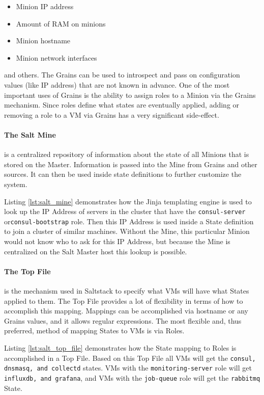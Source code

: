 \begin{itemize}
\item Minion IP address
\item Amount of RAM on minions
\item Minion hostname
\item Minion network interfaces
\end{itemize}

and others. The Grains can be used to introspect and pass on configuration values (like IP address) that are not known in advance. One of the most important uses of Grains is the ability to assign roles to a Minion via the Grains mechanism. Since roles define what states are eventually applied, adding or removing a role to a VM via Grains has a very significant side-effect. 

\paragraph{The Salt Mine} is a centralized repository of information about the state of all Minions that is stored on the Master. Information is passed into the Mine from Grains and other sources. It can then be used inside state definitions to further customize the system.  

Listing \ref{lst:salt_mine} demonstrates how the Jinja templating engine is used to look up the IP Address of servers in the cluster that have the \texttt{consul-server} or\texttt{consul-bootstrap} role. Then this IP Address is used inside a State definition to join a cluster of similar machines. Without the Mine, this particular Minion would not know who to ask for this IP Address, but because the Mine is centralized on the Salt Master host this lookup is possible.

\paragraph{The Top File} is the mechanism used in Saltstack to specify what VMs will have what States applied to them. The Top File provides a lot of flexibility in terms of how to accomplish this mapping. Mappings can be accomplished via hostname or any Grains values, and it allows regular expressions. The most flexible and, thus preferred, method of mapping States to VMs is via Roles.

Listing \ref{lst:salt_top_file} demonstrates how the State mapping to Roles is accomplished in a Top File. Based on this Top File all VMs will get the \texttt{consul, dnsmasq, and collectd} states. VMs with the \texttt{monitoring-server} role will get \texttt{influxdb, and grafana}, and VMs with the \texttt{job-queue} role will get the \texttt{rabbitmq} State.

